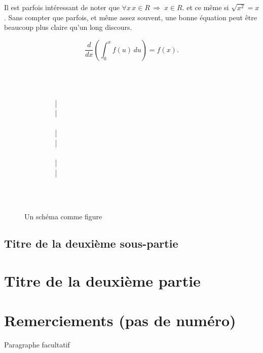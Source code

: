 \documentclass[10pt,a4paper,twoside]{article}
\begin{document}
\lipsum[4]


Il est parfois intéressant de noter que $\forall x \, x \in R \,\Rightarrow\; x \in R$. et ce même si $\sqrt{x^2} = x$. Sans compter que parfois, et même assez souvent, une bonne équation peut être beaucoup plus claire qu'un long discours.

	\[
        \frac{d}{dx}\left( \int_{0}^{x} f(u)\,du\right)=f(x).
     \]


\lipsum[6-7]

\begin{figure}[htbp] 
\begin{center} 
~\\
~\\
\\
 ~~~~~~~~ | \\
 ~~~~~~~~ | \\
\\
~~~~~~~~ | \\
~~~~~~~~ | \\
\\
~~~~~~~~ | \\
~~~~~~~~ | \\
\\

\end{center} 
\caption{Un schéma comme figure} \label{schema} \
\end{figure}

\lipsum[8]

\subsection{Titre de la deuxième sous-partie}

\lipsum[9]

\section{Titre de la deuxième partie}

\lipsum[10-11]

\section*{Remerciements (pas de numéro)} 

Paragraphe facultatif





\nocite{TALN2007,LaigneletRioult09,LanglaisPatry07,SeretanWehrli07}

\end{document}
